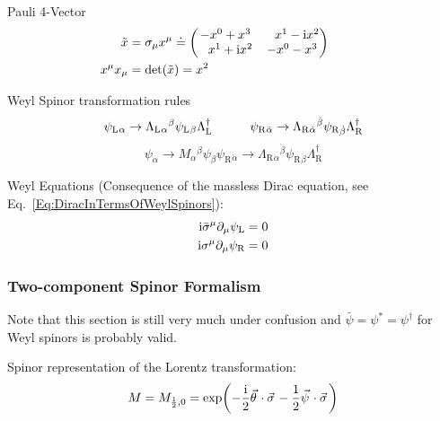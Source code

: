 			\noindent
			Pauli 4-Vector
			\begin{equation}
				\begin{aligned}
					\tilde{x} &= \sigma_\mu x^\mu \doteq \mqty(
					-x^0 + x^3 & \phantom{-}x^1 - \i x^2 \\
					\phantom{-}x^1 + \i x^2 & -x^0 - x^3 \\
					) \hsp \\
					x^\mu x_\mu &= \det(\tilde{x}) = x^2 \\
				\end{aligned}
			\end{equation}

			\noindent
			Weyl Spinor transformation rules
			\begin{equation}
				\psi_\text{L}{}_{\alpha} \to \Lambda_\text{L}{}_{\alpha}{}^\beta \psi_\text{L}{}_{\beta} \Lambda_\text{L}^\dagger \hspace{30pt}
				\psi_\text{R}{}_{\dot{\alpha}} \to \Lambda_\text{R}{}_{\dot{\alpha}}{}^{\dot{\beta}} \psi_\text{R}{}_{\dot{\beta}} \Lambda_\text{R}^\dagger
			\end{equation}
			\begin{equation}
				\psi_{\alpha} \to M_{\alpha}{}^\beta \psi_\beta
				\psi_\text{R}{}_{\dot{\alpha}} \to \Lambda_\text{R}{}_{\dot{\alpha}}{}^{\dot{\beta}} \psi_\text{R}{}_{\dot{\beta}} \Lambda_\text{R}^\dagger
			\end{equation}

			\noindent
			Weyl Equations (Consequence of the massless Dirac equation, see Eq.~\ref{Eq:DiracInTermsOfWeylSpinors}):
			\begin{equation}
				\begin{aligned}
					\mathrm{i} \bar{\sigma}^\mu \partial_\mu \psi_\text{L} &= 0 \\
					\mathrm{i} \sigma^\mu \partial_\mu \psi_\text{R} &= 0 \\
				\end{aligned}
			\end{equation}

		\subsubsection{Two-component Spinor Formalism}
			Note that this section is still very much under confusion and $\bar{\psi} = \psi^{*} = 	\psi^\dagger$ for Weyl spinors is probably valid.

			Spinor representation of the Lorentz transformation:
			\begin{equation}
				M=M_{\frac{1}{2},0} = \exp(-\frac{\i}{2} \vec{\theta}\cdot\vec{\sigma} - \frac{1}{2} \vec{\psi}\cdot\vec{\sigma})
			\end{equation}

